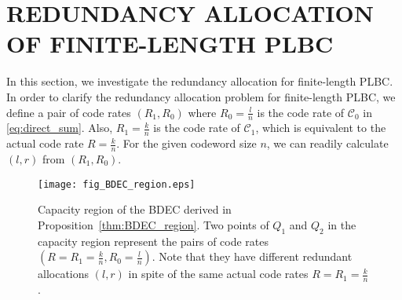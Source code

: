 \documentclass[10pt,twocolumn,twoside,submit]{JCNtran}
\begin{document}
	
	


	
\section{\uppercase{Redundancy Allocation of Finite-Length PLBC}} \label{sec:ra}

	In this section, we investigate the redundancy allocation for finite-length PLBC. In order to clarify the redundancy allocation problem for finite-length PLBC, we define a pair of code rates $\left(R_1, R_0\right)$ where $R_0 = \frac{l}{n}$ is the code rate of ${\mathcal{C}}_0$ in \eqref{eq:direct_sum}. Also, $R_1 = \frac{k}{n}$ is the code rate of ${\mathcal{C}}_1$, which is equivalent to the actual code rate $R = \frac{k}{n}$. For the given codeword size $n$, we can readily calculate $(l, r)$ from $\left(R_1, R_0\right)$. 
	
	\begin{figure}[!t]
		\vspace{-2mm}
		\centering
		\texttt{[image: fig\_BDEC\_region.eps]}
		\vspace{-3mm}
		\caption{Capacity region of the BDEC derived in Proposition~\ref{thm:BDEC_region}. Two points of $Q_1$ and $Q_2$ in the capacity region represent the pairs of code rates $\left(R = R_1 = \frac{k}{n}, R_0 = \frac{l}{n}\right)$. Note that they have different redundant allocations $(l, r)$ in spite of the same actual code rates $R = R_1 = \frac{k}{n}$.}
		\label{fig:BDEC_region}
		\vspace{-5mm}
	\end{figure}
		
\end{document}
